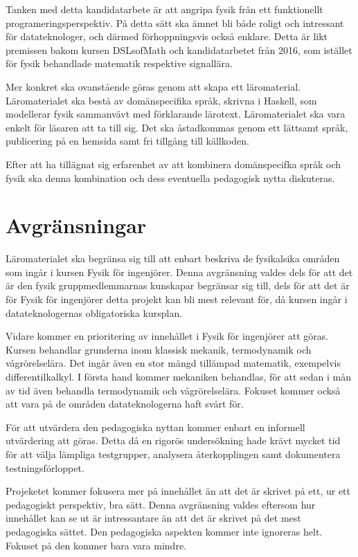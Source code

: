 \begin{draft}

Tanken med detta kandidatarbete är att angripa fysik från ett funktionellt programeringsperspektiv. På detta sätt ska ämnet bli både roligt och intressant för datateknologer, och därmed förhoppningsvis också enklare. Detta är likt premissen bakom kursen DSLsofMath och kandidatarbetet från 2016, som istället för fysik behandlade matematik respektive signallära.

Mer konkret ska ovanstående göras genom att skapa ett läromaterial. Läromaterialet ska bestå av domänspecifika språk, skrivna i Haskell, som modellerar fysik sammanvävt med förklarande lärotext. Läromaterialet ska vara enkelt för läsaren att ta till sig. Det ska åstadkommas genom ett lättsamt språk, publicering på en hemsida samt fri tillgång till källkoden.

Efter att ha tillägnat sig erfarenhet av att kombinera domänspecifka språk och fysik ska denna kombination och dess eventuella pedagogisk nytta diskuteras.

\end{draft}

\section{Avgränsningar}
\label{sec:avgransningar}

\begin{draft}

Läromaterialet ska begränsa sig till att enbart beskriva de fysikalsika områden som ingår i kursen Fysik för ingenjörer. Denna avgränsning valdes dels för att det är den fysik gruppmedlemmarnas kunskapar begränsar sig till, dels för att det är för Fysik för ingenjörer detta projekt kan bli mest relevant för, då kursen ingår i datateknologernas obligatoriska kursplan.

Vidare kommer en prioritering av innehållet i Fysik för ingenjörer att göras. Kursen behandlar grunderna inom klassisk mekanik, termodynamik och vågrörelselära. Det ingår även en stor mängd tillämpad matematik, exempelvis differentilkalkyl. I första hand kommer mekaniken behandlas, för att sedan i mån av tid även behandla termodynamik och vågrörelselära. Fokuset kommer också att vara på de områden datateknologerna haft svårt för.

För att utvärdera den pedagogiska nyttan kommer enbart en informell utvärdering att göras. Detta då en rigorös undersökning hade krävt mycket tid för att välja lämpliga testgrupper, analysera återkopplingen samt dokumentera testningsförloppet.

Projeketet kommer fokusera mer på innehållet än att det är skrivet på ett, ur ett pedagogiskt perspektiv, bra sätt. Denna avgränsning valdes eftersom hur innehållet kan se ut är intressantare än att det är skrivet på det mest pedagogiska sättet. Den pedagogiska aspekten kommer inte ignoreras helt. Fokuset på den kommer bara vara mindre.

\end{draft}



